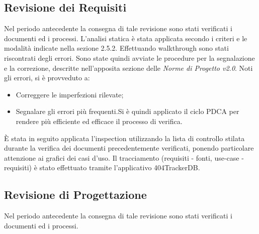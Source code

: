 \subsection{Revisione dei Requisiti}
Nel periodo antecedente la consegna di tale revisione sono stati verificati i documenti ed i processi.
L'analisi statica è stata applicata secondo i criteri e le modalità indicate nella sezione 2.5.2. Effettuando walkthrough sono stati riscontrati degli errori. Sono state quindi avviate le procedure per la segnalazione e la correzione, descritte nell'apposita sezione delle \textit{Norme di Progetto v2.0}.
Noti gli errori, si è provveduto a:
\begin{itemize}
	\item Correggere le imperfezioni rilevate;
	\item Segnalare gli errori più frequenti.Si è quindi applicato il ciclo PDCA per rendere più efficiente ed efficace il processo di verifica.
\end{itemize}
È stata in seguito applicata l'inspection utilizzando la lista di controllo stilata durante la verifica dei documenti precedentemente verificati, ponendo particolare attenzione ai grafici dei casi d'uso.
Il tracciamento (requisiti - fonti, use-case - requisiti) è stato effettuato tramite l'applicativo 404TrackerDB.

\subsection{Revisione di Progettazione}

Nel periodo antecedente la consegna di tale revisione sono stati verificati i documenti ed i processi.
